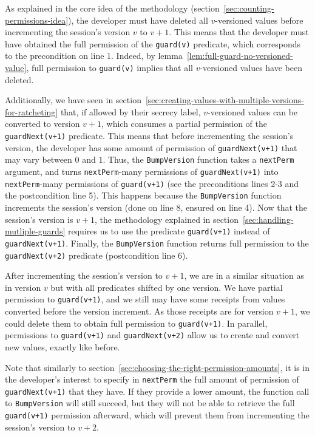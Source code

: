 As explained in the core idea of the methodology (section~\ref{sec:counting-permissions-idea}), the developer must have deleted all $v$-versioned values before incrementing the session's version $v$ to $v+1$. This means that the developer must have obtained the full permission of the \texttt{guard(v)} predicate, which corresponds to the precondition on line 1.
Indeed, by lemma~\ref{lem:full-guard-no-versioned-value}, full permission to \texttt{guard(v)} implies that all $v$-versioned values have been deleted.

Additionally, we have seen in section~\ref{sec:creating-values-with-multiple-versions-for-ratcheting} that, if allowed by their secrecy label, $v$-versioned values can be converted to version $v+1$, which consumes a partial permission of the \texttt{guardNext(v+1)} predicate.
This means that before incrementing the session's version, the developer has some amount of permission of \texttt{guardNext(v+1)} that may vary between $0$ and $1$.
Thus, the \texttt{BumpVersion} function takes a \texttt{nextPerm} argument, and turns \texttt{nextPerm}-many permissions of \texttt{guardNext(v+1)} into \texttt{nextPerm}-many permissions of \texttt{guard(v+1)} (see the preconditions lines 2-3 and the postcondition line 5).
This happens because the \texttt{BumpVersion} function increments the session's version (done on line 8, ensured on line 4).
Now that the session's version is $v+1$, the methodology explained in section~\ref{sec:handling-mutliple-guards} requires us to use the predicate \texttt{guard(v+1)} instead of \texttt{guardNext(v+1)}.
Finally, the \texttt{BumpVersion} function returns full permission to the \texttt{guardNext(v+2)} predicate (postcondition line 6).

After incrementing the session's version to $v+1$, we are in a similar situation as in version $v$ but with all predicates shifted by one version.
We have partial permission to \texttt{guard(v+1)}, and we still may have some receipts from values converted before the version increment.
As those receipts are for version $v+1$, we could delete them to obtain full permission to \texttt{guard(v+1)}.
In parallel, permissions to \texttt{guard(v+1)} and \texttt{guardNext(v+2)} allow us to create and convert new values, exactly like before.

Note that similarly to section~\ref{sec:choosing-the-right-permission-amounts}, it is in the developer's interest to specify in \texttt{nextPerm} the full amount of permission of \texttt{guardNext(v+1)} that they have. If they provide a lower amount, the function call to \texttt{BumpVersion} will still succeed, but they will not be able to retrieve the full \texttt{guard(v+1)} permission afterward, which will prevent them from incrementing the session's version to $v+2$.


